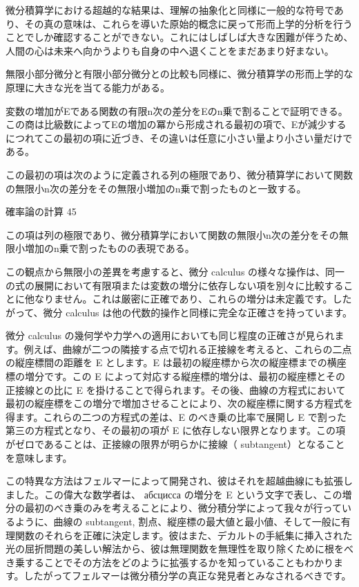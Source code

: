 \documentclass[a4paper,11pt,openany]{ltjsbook}
\begin{document}
微分積算学における超越的な結果は、理解の抽象化と同様に一般的な符号であり、その真の意味は、これらを導いた原始的概念に戻って形而上学的分析を行うことでしか確認することができない。これにはしばしば大きな困難が伴うため、人間の心は未来へ向かうよりも自身の中へ退くことをまだあまり好まない。

無限小部分微分と有限小部分微分との比較も同様に、微分積算学の形而上学的な原理に大きな光を当てる能力がある。

変数の増加がEである関数の有限n次の差分をEのn乗で割ることで証明できる。この商は比級数によってEの増加の冪から形成される最初の項で、Eが減少するにつれてこの最初の項に近づき、その違いは任意に小さい量より小さい量だけである。

この最初の項は次のように定義される列の極限であり、微分積算学において関数の無限小n次の差分をその無限小増加のn乗で割ったものと一致する。

確率論の計算 45

この項は列の極限であり、微分積算学において関数の無限小n次の差分をその無限小増加のn乗で割ったものの表現である。

この観点から無限小の差異を考慮すると、微分 calculus の様々な操作は、同一の式の展開において有限項または変数の増分に依存しない項を別々に比較することに他なりません。これは厳密に正確であり、これらの増分は未定義です。したがって、微分 calculus は他の代数的操作と同様に完全な正確さを持っています。

微分 calculus の幾何学や力学への適用においても同じ程度の正確さが見られます。例えば、曲線が二つの隣接する点で切れる正接線を考えると、これらの二点の縦座標間の距離を E とします。E は最初の縦座標から次の縦座標までの横座標の増分です。この E によって対応する縦座標的増分は、最初の縦座標とその正接線との比に E を掛けることで得られます。その後、曲線の方程式において最初の縦座標をこの増分で増加させることにより、次の縦座標に関する方程式を得ます。これらの二つの方程式の差は、E のべき乗の比率で展開し E で割った第三の方程式となり、その最初の項が E に依存しない限界となります。この項がゼロであることは、正接線の限界が明らかに接線（ subtangent）となることを意味します。

この特異な方法はフェルマーによって開発され、彼はそれを超越曲線にも拡張しました。この偉大な数学者は、 абсцисса の増分を E という文字で表し、この増分の最初のべき乗のみを考えることにより、微分積分学によって我々が行っているように、曲線の subtangent, 割点、縦座標の最大値と最小値、そして一般に有理関数のそれらを正確に決定します。彼はまた、デカルトの手紙集に挿入された光の屈折問題の美しい解法から、彼は無理関数を無理性を取り除くために根をべき乗することでその方法をどのように拡張するかを知っていることもわかります。したがってフェルマーは微分積分学の真正な発見者とみなされるべきです。
\end{document}
